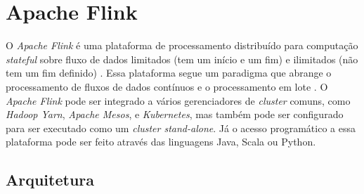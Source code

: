 




\section{Apache Flink}

O \emph{Apache Flink} é uma plataforma de processamento distribuído para
computação \emph{stateful} sobre fluxo de dados limitados (tem um início e um
fim) e ilimitados (não tem um fim definido) \cite{ApacheFlink2020}.
Essa plataforma segue um paradigma que abrange o processamento de fluxos de
dados contínuos e o processamento em lote \cite{Carbone2015,Lopez2018}.
O \emph{Apache Flink} pode ser integrado a vários gerenciadores de \emph{cluster}
comuns, como \emph{Hadoop Yarn}, \emph{Apache Mesos}, e \emph{Kubernetes}, mas também pode ser
configurado para ser executado como um \emph{cluster stand-alone}.
Já o acesso programático a essa plataforma pode ser feito através das linguagens
Java, Scala ou Python.

\subsection{Arquitetura}

